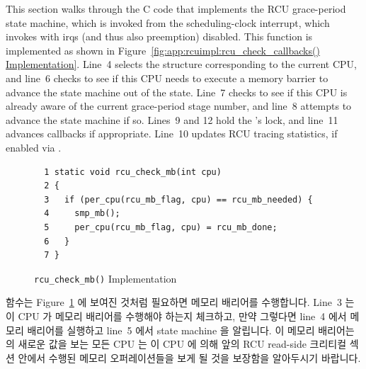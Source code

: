 This section walks through the C code that implements the RCU
grace-period state machine, which is invoked from the scheduling-clock
interrupt, which invokes  with
irqs (and thus also preemption) disabled.
This function is implemented as shown in
Figure~\ref{fig:app:rcuimpl:rcu_check_callbacks() Implementation}.
Line~4 selects the  structure corresponding
to the current CPU, and line~6 checks to see if this CPU needs
to execute a memory barrier to advance the state machine out of the
 state.
Line~7 checks to see if this CPU is already aware of the
current grace-period stage number, and line~8 attempts to advance the
state machine if so.
Lines~9 and 12 hold the 's lock, and
line~11 advances callbacks if appropriate.
Line~10 updates RCU tracing statistics, if enabled via
.
\fi

\begin{figure}[tbp]
{ \scriptsize
\begin{verbatim}
  1 static void rcu_check_mb(int cpu)
  2 {
  3   if (per_cpu(rcu_mb_flag, cpu) == rcu_mb_needed) {
  4     smp_mb();
  5     per_cpu(rcu_mb_flag, cpu) = rcu_mb_done;
  6   }
  7 }
\end{verbatim}
}
\caption{{\tt rcu\_check\_mb()} Implementation}
\label{fig:app:rcuimpl:rcu_check_mb() Implementation}
\end{figure}

 함수는
Figure~\ref{fig:app:rcuimpl:rcu_check_mb() Implementation}
에 보여진 것처럼 필요하면 메모리 배리어를 수행합니다.
Line~3 는 이 CPU 가 메모리 배리어를 수행해야 하는지 체크하고, 만약 그렇다면
line~4 에서 메모리 배리어를 실행하고 line~5 에서 state machine 을 알립니다.
이 메모리 배리어는  의 새로운 값을 보는 모든 CPU 는 이 CPU 에
의해 앞의 RCU read-side 크리티컬 섹션 안에서 수행된 메모리 오퍼레이션들을 보게
될 것을 보장함을 알아두시기 바랍니다.

